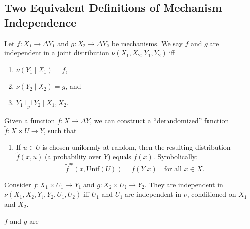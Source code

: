 \documentclass{article}
\newcommand{\CI}{\mathbin{\bot\!\!\!\bot}}
\begin{document}
    
    \subsection*{Two Equivalent Definitions of Mechanism Independence}
    
    \begin{defn}
        Let $f : X_1 \to \Delta Y_1$ and $g : X_2 \to \Delta Y_2$ be mechanisms.
        We say $f$ and $g$ are independent in a joint distribution $\nu(X_1, X_2, Y_1, Y_2)$ iff
        \begin{enumerate}[nosep]
        \item $\nu(Y_1 \mid X_1) = f$,
        \item $\nu(Y_2 \mid X_2) = g$, and
        \item $\displaystyle Y_1 \underset\nu{\CI} Y_2 \mid X_1, X_2$.
            
        \end{enumerate}        
    \end{defn}
    
    \begin{claim}
        Given a function $f : X \to \Delta Y$, we can construct a ``derandomized'' function $\tilde f : X \times U \to Y$,
        such that 
        \begin{enumerate}[label=(\alph*),nosep]
            \item If $u \in U$ is chosen uniformly at random, then
                the resulting distribution $\tilde f(x, u)$ (a probability over $Y$) equals $f(x)$.  Symbolically:
            \[
                \tilde f^\#(x, \mathrm{Unif}(U)) = f(Y|x) \quad\text{for all } x \in X.
            \]
        \end{enumerate}
    \end{claim}   
    
    
    \begin{defn}
        Consider $f : X_1 \times U_1 \to Y_1$ and $g : X_2 \times U_2 \to Y_2$. 
        They are independent in $\nu(X_1, X_2, Y_1, Y_2, U_1, U_2)$
        iff $U_1$ and $U_1$ are independent in $\nu$, conditioned on $X_1$ and $X_2$. 
    \end{defn}
    
    
    \begin{prop}
        $f$ and $g$ are 
    \end{prop}
    
\end{document}
